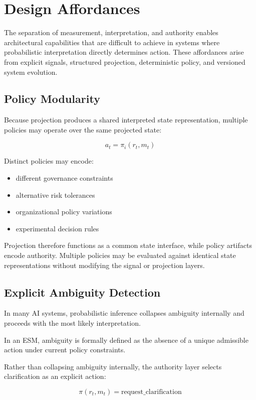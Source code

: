 \documentclass[11pt]{article}
\begin{document}
\section{Design Affordances}

The separation of measurement, interpretation, and authority enables architectural capabilities that are difficult to achieve in systems where probabilistic interpretation directly determines action. These affordances arise from explicit signals, structured projection, deterministic policy, and versioned system evolution.

\subsection{Policy Modularity}

Because projection produces a shared interpreted state representation, multiple policies may operate over the same projected state:

\[
a_t = \pi_i(r_t, m_t)
\]

Distinct policies may encode:

\begin{itemize}
  \item different governance constraints
  \item alternative risk tolerances
  \item organizational policy variations
  \item experimental decision rules
\end{itemize}

Projection therefore functions as a common state interface, while policy artifacts encode authority. Multiple policies may be evaluated against identical state representations without modifying the signal or projection layers.

\subsection{Explicit Ambiguity Detection}

In many AI systems, probabilistic inference collapses ambiguity internally and proceeds with the most likely interpretation.

In an ESM, ambiguity is formally defined as the absence of a unique admissible action under current policy constraints.

Rather than collapsing ambiguity internally, the authority layer selects clarification as an explicit action:

\[
\pi(r_t, m_t) = \text{request\_clarification}
\]
\end{document}
